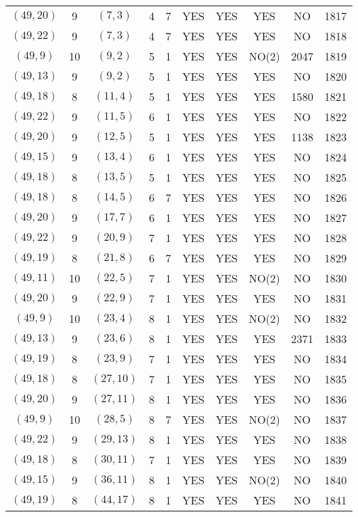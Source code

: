 \begin{longtable}{|c|c|c|c|c|c|c|c|c|c|}
$(49, 20)$ & 9 & $(7, 3)$ & 4 & 7 & YES & YES & YES & NO & 1817\\
$(49, 22)$ & 9 & $(7, 3)$ & 4 & 7 & YES & YES & YES & NO & 1818\\
$(49, 9)$ & 10 & $(9, 2)$ & 5 & 1 & YES & YES & NO(2) & 2047 & 1819\\
$(49, 13)$ & 9 & $(9, 2)$ & 5 & 1 & YES & YES & YES & NO & 1820\\
$(49, 18)$ & 8 & $(11, 4)$ & 5 & 1 & YES & YES & YES & 1580 & 1821\\
$(49, 22)$ & 9 & $(11, 5)$ & 6 & 1 & YES & YES & YES & NO & 1822\\
$(49, 20)$ & 9 & $(12, 5)$ & 5 & 1 & YES & YES & YES & 1138 & 1823\\
$(49, 15)$ & 9 & $(13, 4)$ & 6 & 1 & YES & YES & YES & NO & 1824\\
$(49, 18)$ & 8 & $(13, 5)$ & 5 & 1 & YES & YES & YES & NO & 1825\\
$(49, 18)$ & 8 & $(14, 5)$ & 6 & 7 & YES & YES & YES & NO & 1826\\
$(49, 20)$ & 9 & $(17, 7)$ & 6 & 1 & YES & YES & YES & NO & 1827\\
$(49, 22)$ & 9 & $(20, 9)$ & 7 & 1 & YES & YES & YES & NO & 1828\\
$(49, 19)$ & 8 & $(21, 8)$ & 6 & 7 & YES & YES & YES & NO & 1829\\
$(49, 11)$ & 10 & $(22, 5)$ & 7 & 1 & YES & YES & NO(2) & NO & 1830\\
$(49, 20)$ & 9 & $(22, 9)$ & 7 & 1 & YES & YES & YES & NO & 1831\\
$(49, 9)$ & 10 & $(23, 4)$ & 8 & 1 & YES & YES & NO(2) & NO & 1832\\
$(49, 13)$ & 9 & $(23, 6)$ & 8 & 1 & YES & YES & YES & 2371 & 1833\\
$(49, 19)$ & 8 & $(23, 9)$ & 7 & 1 & YES & YES & YES & NO & 1834\\
$(49, 18)$ & 8 & $(27, 10)$ & 7 & 1 & YES & YES & YES & NO & 1835\\
$(49, 20)$ & 9 & $(27, 11)$ & 8 & 1 & YES & YES & YES & NO & 1836\\
$(49, 9)$ & 10 & $(28, 5)$ & 8 & 7 & YES & YES & NO(2) & NO & 1837\\
$(49, 22)$ & 9 & $(29, 13)$ & 8 & 1 & YES & YES & YES & NO & 1838\\
$(49, 18)$ & 8 & $(30, 11)$ & 7 & 1 & YES & YES & YES & NO & 1839\\
$(49, 15)$ & 9 & $(36, 11)$ & 8 & 1 & YES & YES & NO(2) & NO & 1840\\
$(49, 19)$ & 8 & $(44, 17)$ & 8 & 1 & YES & YES & YES & NO & 1841\\

\end{longtable}
